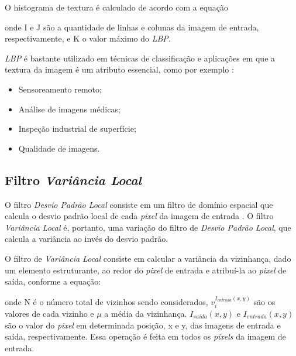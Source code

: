 \par O histograma de textura é calculado de acordo com a equação 

\noindent onde I e J são a quantidade de linhas e colunas da imagem de entrada, respectivamente, e K o valor máximo do \textit{\acrshort{LBP}}.

\par \textit{\acrshort{LBP}} é bastante utilizado em técnicas de classificação e aplicações em que a textura da imagem é um atributo essencial, como por exemplo \cite{ojala2002LBP}:

\begin{itemize}
    \item Sensoreamento remoto;
    \item Análise de imagens médicas;
    \item Inspeção industrial de superfície;
    \item Qualidade de imagens.
\end{itemize}


\subsection{Filtro \textit{Variância Local}}\label{sec:dom_esp:filtro_std}

\par O filtro \textit{Desvio Padrão Local} consiste em um filtro de domínio espacial que calcula o desvio padrão local de cada \textit{pixel} da imagem de entrada \cite{stdfilt}. O filtro \textit{Variância Local} é, portanto, uma variação do filtro de \textit{Desvio Padrão Local}, que calcula a variância ao invés do desvio padrão.

\par O filtro de \textit{Variância Local} consiste em calcular a variância da vizinhança, dado um elemento estruturante, ao redor do \textit{pixel} de entrada e atribuí-la ao \textit{pixel} de saída, conforme a equação:


\noindent onde N é o número total de vizinhos sendo considerados, $v_{i}^{I_{entrada}(x,y)}$ são os valores de cada vizinho e $\mu$ a média da vizinhança. $I_{saida}(x,y)$ e $I_{entrada}(x,y)$ são o valor do \textit{pixel} em determinada posição, x e y, das imagens de entrada e saída, respectivamente. Essa operação é feita em todos os \textit{pixels} da imagem de entrada.


